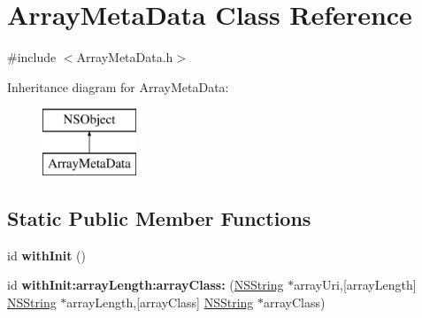 \hypertarget{interface_array_meta_data}{
\section{\-Array\-Meta\-Data \-Class \-Reference}
\label{interface_array_meta_data}
}


{\ttfamily \#include $<$\-Array\-Meta\-Data.\-h$>$}

\-Inheritance diagram for \-Array\-Meta\-Data\-:\begin{figure}[H]
\begin{center}
\leavevmode
\includegraphics[height=2.000000cm]{interface_array_meta_data}
\end{center}
\end{figure}
\subsection*{\-Static \-Public \-Member \-Functions}
\begin{DoxyCompactItemize}
\item 
\hypertarget{interface_array_meta_data_a2318e49d41c9ba108190bf0222306fd2}{
id {\bfseries with\-Init} ()}
\label{interface_array_meta_data_a2318e49d41c9ba108190bf0222306fd2}

\item 
\hypertarget{interface_array_meta_data_aaa469e959673c35e2b5a6dbbf96dc953}{
id {\bfseries with\-Init\-:array\-Length\-:array\-Class\-:} (\hyperlink{class_n_s_string}{\-N\-S\-String} $\ast$array\-Uri,\mbox{[}array\-Length\mbox{]} \hyperlink{class_n_s_string}{\-N\-S\-String} $\ast$array\-Length,\mbox{[}array\-Class\mbox{]} \hyperlink{class_n_s_string}{\-N\-S\-String} $\ast$array\-Class)}
\label{interface_array_meta_data_aaa469e959673c35e2b5a6dbbf96dc953}

\end{DoxyCompactItemize}
